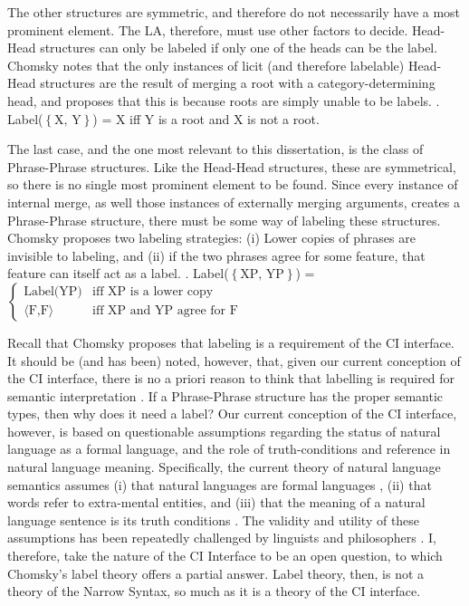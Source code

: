 \documentclass[letterpaper,12pt]{article}
\newcommand{\hh}{$\left\{ \text{X, Y} \right\}$}
\newcommand{\xpyp}{$\left\{ \text{XP, YP} \right\}$}
\begin{document}
The other structures are symmetric, and therefore do not necessarily have a most prominent element.
The LA, therefore, must use other factors to decide.
Head-Head structures can only be labeled if only one of the heads can be the label.
Chomsky notes that the only instances of licit (and therefore labelable) Head-Head structures are the result of merging a root with a category-determining head, and proposes that this is because roots are simply unable to be labels.
\ex.\label{ex:hh_rule} Label(\hh) = X iff Y is a root and X is not a root.

The last case, and the one most relevant to this dissertation, is the class of Phrase-Phrase structures.
Like the Head-Head structures, these are symmetrical, so there is no single most prominent element to be found.
Since every instance of internal merge, as well those instances of externally merging arguments, creates a Phrase-Phrase structure, there must be some way of labeling these structures.
Chomsky proposes two labeling strategies: (i) Lower copies of phrases are invisible to labeling, and (ii) if the two phrases agree for some feature, that feature can itself act as a label.
\ex.\label{ex:xpyp_rule} Label(\xpyp) = $
\begin{cases}
  \text{Label(YP)} & \text{iff XP is a lower copy}\\
  \langle\text{F,F}\rangle & \text{iff XP and YP agree for F}
\end{cases}
$

Recall that Chomsky proposes that labeling is a requirement of the CI interface.
It should be (and has been) noted, however, that, given our current conception of the CI interface, there is no a priori reason to think that labelling is required for semantic interpretation \parencite[see \textit{e.g.,}][]{hornstein2016arizona}.
If a Phrase-Phrase structure has the proper semantic types, then why does it need a label?
Our current conception of the CI interface, however, is based on questionable assumptions regarding the status of natural language as a formal language, and the role of truth-conditions and reference in natural language meaning.
Specifically, the current theory of natural language semantics assumes (i) that natural languages are formal languages \parencite{montague1970english}, (ii) that words refer to extra-mental entities, and (iii) that the meaning of a natural language sentence is its truth conditions \textcite{heimkratzer1998semantics}.
The validity and utility of these assumptions has been repeatedly challenged by linguists and philosophers \parencite{chomsky2000new,pietroski2005events,moravcsik1998meaning,hornstein1984logic}.
I, therefore, take the nature of the CI Interface to be an open question, to which Chomsky's label theory offers a partial answer.
Label theory, then, is not a theory of the Narrow Syntax, so much as it is a theory of the CI interface.
\end{document}
